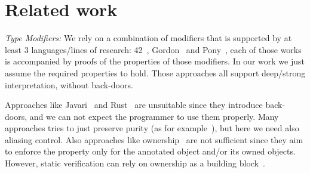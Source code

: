 
\saveSpace
\section{Related work}
\label{s:related}
\saveSpace

\noindent\textit{Type Modifiers:}
We rely on a combination of modifiers that is supported by at least 3 languages/lines of research:
42~\cite{ServettoZucca15,ServettoEtAl13a,JOT:issue_2011_01/article1,GianniniEtAl16},
Gordon~\cite{GordonEtAl12}
and Pony~\cite{clebsch2015deny,clebsch2017orca},
each of those works is accompanied by proofs of the properties of those modifiers.
In our work we just assume the required properties to hold.
 Those approaches all support deep/strong interpretation, without back-doors.

Approaches like Javari~\cite{TschantzErnst05,Boyland06} and Rust~\cite{matsakis2014rust}
are unsuitable since they introduce back-doors, and we can not expect the programmer to use them properly.
Many approaches tries to just preserve purity (as for example~\cite{pearce2011jpure}),
but here we need also aliasing control.
Also approaches like ownership~\cite{ClarkeEtAl13,ZibinEtAl10,DietlEtAl07}
are not sufficient since they aim to enforce the property only for
the annotated object and/or its owned objects.
However, static verification can rely on ownership as a building block~\cite{%
muller2002modular,%
barnett2011specification%
}.%





